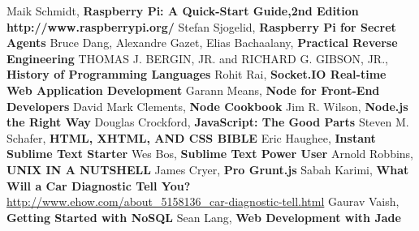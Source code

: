 \documentclass[11pt, oneside]{Thesis} %
\begin{document}

\appendix %



%
%


\backmatter


\begin{thebibliography}{999}
Maik Schmidt, \textbf{Raspberry Pi: A Quick-Start Guide,2nd Edition}
\textbf{http://www.raspberrypi.org/}
Stefan Sjogelid, \textbf{Raspberry Pi for Secret Agents}
Bruce Dang, Alexandre Gazet, Elias Bachaalany, \textbf{Practical Reverse Engineering}
THOMAS J. BERGIN, JR. and RICHARD G. GIBSON, JR., \textbf{History of Programming Languages}
Rohit Rai, \textbf{Socket.IO Real-time Web Application Development}
Garann Means, \textbf{Node for Front-End Developers}
David Mark Clements, \textbf{Node Cookbook}
Jim R. Wilson, \textbf{Node.js the Right Way}
Douglas Crockford, \textbf{JavaScript: The Good Parts}
Steven M. Schafer, \textbf{HTML, XHTML, AND CSS BIBLE}
Eric Haughee, \textbf{Instant Sublime Text Starter}
Wes Bos, \textbf{Sublime Text Power User}
Arnold Robbins, \textbf{UNIX IN A NUTSHELL}
James Cryer, \textbf{Pro Grunt.js}
Sabah Karimi, \textbf{What Will a Car Diagnostic Tell You?} \url{http://www.ehow.com/about_5158136_car-diagnostic-tell.html}
Gaurav Vaish, \textbf{Getting Started with NoSQL}
Sean Lang, \textbf{Web Development with Jade}
\end{thebibliography}
\end{document}
